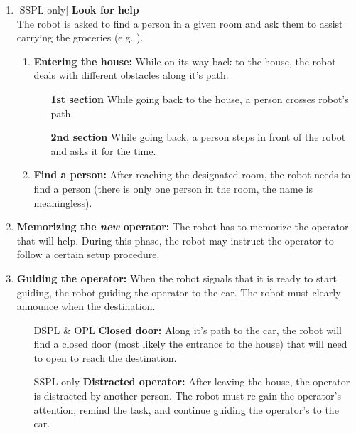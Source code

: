 \begin{enumerate}
  \setcounter{enumi}{\theenumTemp}
  \item {[SSPL only]} \textbf{Look for help} \\
  The robot is asked to find a person in a given room and ask them to assist carrying the groceries (e.g. ).
  \begin{enumerate}
    \item \textbf{Entering the house:} While on its way back to the house, the robot deals with different obstacles along it's path.
    \begin{itemize}[leftmargin=3cm]
      \item[\textbf{1st section}] While going back to the house, a person crosses robot's path.
      \item[\textbf{2nd section}] While going back, a person steps in front of the robot and asks it for the time.
    \end{itemize}

    \item \textbf{Find a person:} After reaching the designated room, the robot needs to find a person (there is only one person in the room, the name is meaningless).
  \end{enumerate}

  \item \textbf{Memorizing the \emph{new} operator:} The robot has to memorize the operator that will help. During this phase, the robot may instruct the operator to follow a certain setup procedure.

  \item \textbf{Guiding the operator:} When the robot signals that it is ready to start guiding, the robot guiding the operator to the car. The robot must clearly announce when the destination.
  \begin{itemize}[leftmargin=3cm]
    \item[DSPL \& OPL] \textbf{Closed door:} Along it's path to the car, the robot will find a closed door (most likely the entrance to the house) that will need to open to reach the destination.
    \item[SSPL only] \textbf{Distracted operator:} After leaving the house, the operator is distracted by another person. The robot must re-gain the operator's attention, remind the task, and continue guiding the operator's to the car.
  \end{itemize}

\end{enumerate}

